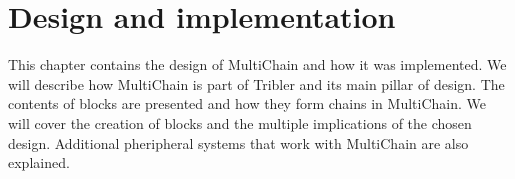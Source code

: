 \chapter{Design and implementation}
This chapter contains the design of MultiChain and how it was implemented.
We will describe how MultiChain is part of Tribler and its main pillar of design.
The contents of blocks are presented and how they form chains in MultiChain.
We will cover the creation of blocks and the multiple implications of the chosen design.
Additional pheripheral systems that work with MultiChain are also explained.










